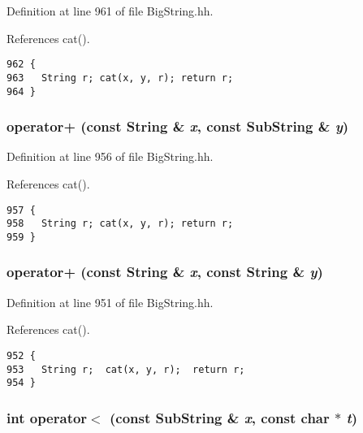 Definition at line 961 of file Big\-String.hh.

References cat().



\footnotesize\begin{verbatim}962 {
963   String r; cat(x, y, r); return r;
964 }
\end{verbatim}\normalsize 
{}
\subsubsection{ operator+ (const {\bf String} \& {\em x}, const {\bf Sub\-String} \& {\em y})\hspace{0.3cm}{\tt  [inline]}}\label{BigString_8hh_a71}




Definition at line 956 of file Big\-String.hh.

References cat().



\footnotesize\begin{verbatim}957 {
958   String r; cat(x, y, r); return r;
959 }
\end{verbatim}\normalsize 
{}
\subsubsection{ operator+ (const {\bf String} \& {\em x}, const {\bf String} \& {\em y})\hspace{0.3cm}{\tt  [inline]}}\label{BigString_8hh_a70}




Definition at line 951 of file Big\-String.hh.

References cat().



\footnotesize\begin{verbatim}952 {
953   String r;  cat(x, y, r);  return r;
954 }
\end{verbatim}\normalsize 
{}
\subsubsection{\setlength{\rightskip}{0pt plus 5cm}int operator$<$ (const {\bf Sub\-String} \& {\em x}, const char $\ast$ {\em t})\hspace{0.3cm}{\tt  [inline]}}\label{BigString_8hh_a120}




